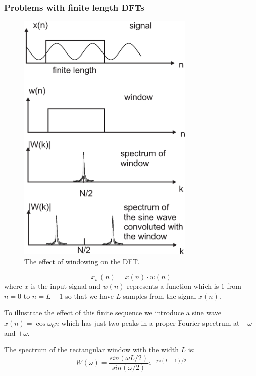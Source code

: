 \documentclass[12pt,a4paper]{article}
\begin{document}
\subsubsection{Problems with finite length DFTs}
\begin{figure}[!hbt]
\begin{center}
\mbox{\includegraphics[width=0.75\textwidth]{windowing_dft}}
\end{center}
\caption{The effect of windowing on the DFT.
\label{windowing_dft}}
\end{figure}
\begin{equation}
x_w(n) = x(n) \cdot w(n)
\end{equation}
where $x$ is the input signal and $w(n)$ represents a function
which is $1$ from $n=0$ to $n=L-1$ so that we have $L$ samples
from the signal $x(n)$.

To illustrate the effect of this finite sequence we introduce a sine
wave $x(n) = \cos \omega_0 n$ which has just two peaks in a proper
Fourier spectrum at $-\omega$ and $+\omega$.

The spectrum of the rectangular window with the width $L$ is:
\begin{equation} 
W(\omega) = \frac{sin(\omega L /2)}{sin (\omega / 2)} e^{-j\omega (L -1)/2}
\end{equation}
\end{document}
